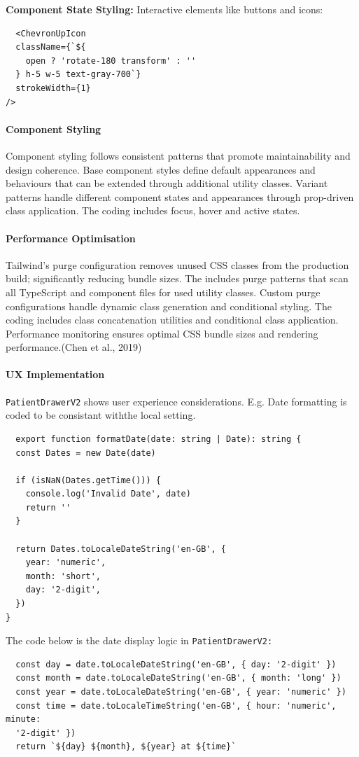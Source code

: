 \textbf{Component State Styling:} Interactive elements like buttons and icons:
\begin{verbatim}
  <ChevronUpIcon
  className={`${
    open ? 'rotate-180 transform' : ''
  } h-5 w-5 text-gray-700`}
  strokeWidth={1}
/>
\end{verbatim}

\paragraph{Component Styling}\mbox{}

Component styling follows consistent patterns that promote maintainability and design coherence. Base component styles define default appearances and behaviours that can be extended through additional utility classes. Variant patterns handle different component states and appearances through prop-driven class application. The coding includes focus, hover and active states.

\paragraph{Performance Optimisation}\mbox{}


Tailwind's purge configuration removes unused CSS classes from the production build; significantly reducing bundle sizes. The includes purge patterns that scan all TypeScript and component files for used utility classes. Custom purge configurations handle dynamic class generation and conditional styling. The coding includes class concatenation utilities and conditional class application. Performance monitoring ensures optimal CSS bundle sizes and rendering performance.(Chen et al., 2019)

\paragraph{UX Implementation}\mbox{}

\texttt{PatientDrawerV2} shows user experience considerations. E.g. Date formatting is coded to be consistant withthe local setting.
\begin{verbatim}
  export function formatDate(date: string | Date): string {
  const Dates = new Date(date)

  if (isNaN(Dates.getTime())) {
    console.log('Invalid Date', date)
    return ''
  }

  return Dates.toLocaleDateString('en-GB', {
    year: 'numeric',
    month: 'short',
    day: '2-digit',
  })
}
\end{verbatim}

The code below is the date display logic in \texttt{PatientDrawerV2:}
\begin{verbatim}
  const day = date.toLocaleDateString('en-GB', { day: '2-digit' })
  const month = date.toLocaleDateString('en-GB', { month: 'long' })
  const year = date.toLocaleDateString('en-GB', { year: 'numeric' })
  const time = date.toLocaleTimeString('en-GB', { hour: 'numeric', minute:
  '2-digit' })
  return `${day} ${month}, ${year} at ${time}`
\end{verbatim}
